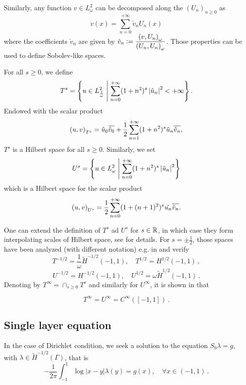 \documentclass[a4paper]{article}
\begin{document}
Similarly, any 
function $v\in L^2_{\omega}$ can be decomposed along the $(U_n)_{n\geq 0}$ as
\[ v(x) = \sum_{n=0}^{+\infty} \check{v}_n U_n(x)\]
where the coefficients $\check{v}_n$ are given by $\check{v}_n \mathrel{\mathop:}= 
\dfrac{\left( v,U_n\right)_{\omega}}{\left( U_n,U_n\right)_\omega}$.
Those properties can be used to define Sobolev-like spaces. 
\begin{Def}
	For all $s \geq 0$, we define 
	\[T^s = \left\{ u \in L^2_\frac{1}{\omega}\mathrel{}\middle|\mathrel{} \sum_{n=0}^{+\infty}(1+n^2)^s \left\lvert \hat{u}_n \right\rvert^2 < + \infty\right\}.\]
	Endowed with the scalar product
	\[\left( u,v\right)_{T^s} = \hat{u}_0 \overline{\hat{v}_0} + \frac{1}{2}\sum_{n=1}^{+\infty}(1+n^2)^s\hat{u}_n \overline{\hat{v}_n},\]
	$T^s$ is a Hilbert space for all $s \geq 0$. 
	Similarly, we set
	\[U^s = \left\{u \in L^2_\omega\mathrel{}\middle|\mathrel{} \sum_{n=0}^{+\infty} (1 + n^2)^s\left\lvert \check{u}_n \right\rvert^2\right\}\]
	which is a Hilbert space for the scalar product
	\[\left( u,v\right)_{U^s} = \frac{1}{2} \sum_{n=0}^{+ \infty} (1 + (n+1)^2)^s\check{u_n}\overline{\check{v}_n}.\]
\end{Def}
One can extend the definition of $T^s$ ad $U^s$ for $s\in \mathbb{R}$, in which case they form interpolating scales of Hilbert space, see \cite{averseng} for details.  For $s = \pm \frac{1}{2}$, those spaces 
have been analyzed (with different notation) e.g. in \cite{jerez2012explicit} and verify
\begin{equation}
\label{lemJerez1}
T^{-1/2} = \frac{1}{\omega} \tilde{H}^{-1/2}(-1,1), \quad T^{1/2} = H^{1/2}(-1,1)\,,
\end{equation}
\begin{equation}
\label{lemJerez2}
U^{-1/2} = H^{-1/2}(-1,1), \quad U^{1/2} = \omega \tilde{H}^{1/2}(-1,1)\,.
\end{equation}
Denoting by $T^\infty = \cap_{s \geq 0} T^s$ and similarly for $U^\infty$, it is shown in \cite{averseng} that
\begin{Lem}
	\[T^{\infty} = U^{\infty} = C^{\infty}([-1,1])\,.\]
	\label{LemTinfCinf}
\end{Lem}

\subsection{Single layer equation}

In the case of Dirichlet condition, we seek a solution to the equation $S_0\lambda = g$, with $\lambda \in \tilde{H}^{-1/2}(\Gamma)$, that is
\begin{equation}
-\frac{1}{2\pi}\int_{-1}^{1} \log|x-y| \lambda(y) = g(x), \quad \forall x\in (-1,1)\,.\label{Slambda}
\end{equation} 
\end{document}
